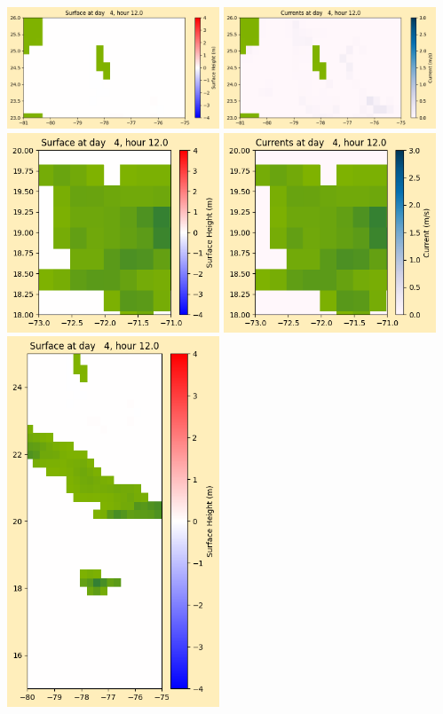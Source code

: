 \documentclass[11pt]{article}
\begin{document}
\vskip 10pt 
\includegraphics[width=0.475\textwidth]{frame0030fig1003.png}
\includegraphics[width=0.475\textwidth]{frame0030fig1004.png}
\vskip 10pt 
\includegraphics[width=0.475\textwidth]{frame0030fig1005.png}
\includegraphics[width=0.475\textwidth]{frame0030fig1006.png}
\vskip 10pt 
\includegraphics[width=0.475\textwidth]{frame0030fig1007.png}
\end{document}
